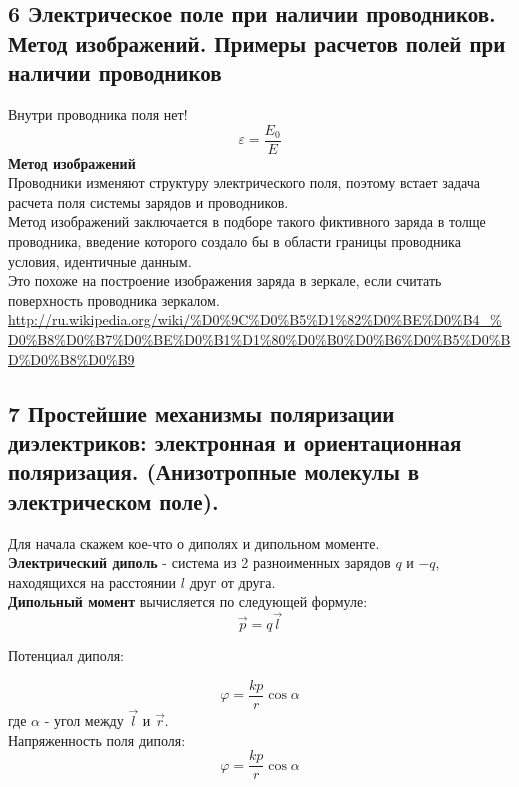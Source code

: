 \documentclass[a4paper,12pt]{article}
\begin{document}
\subsection{6   Электрическое поле при наличии проводников. Метод изображений. Примеры расчетов полей при наличии проводников}
Внутри проводника поля нет!\\
\begin{equation}
	\varepsilon = \frac{E_0}{E}
\end{equation}
\textbf{Метод изображений} \\
Проводники изменяют структуру электрического поля, поэтому встает задача расчета поля системы зарядов и проводников. \\
Метод изображений заключается в подборе такого фиктивного заряда в толще проводника, введение которого создало бы в области границы проводника условия, идентичные данным. \\
Это похоже на построение изображения заряда в зеркале, если считать поверхность проводника зеркалом. \\
\url{http://ru.wikipedia.org/wiki/%D0%9C%D0%B5%D1%82%D0%BE%D0%B4_%D0%B8%D0%B7%D0%BE%D0%B1%D1%80%D0%B0%D0%B6%D0%B5%D0%BD%D0%B8%D0%B9}

\subsection{7   Простейшие механизмы поляризации диэлектриков: электронная и ориентационная поляризация. (Анизотропные молекулы в электрическом поле).}
Для начала скажем кое-что о диполях и дипольном моменте. \\
\textbf{Электрический диполь} - система из 2 разноименных зарядов $ q $ и $ -q $, находящихся на расстоянии $ l $ друг от друга. \\
\textbf{Дипольный момент} вычисляется по следующей формуле:
\begin{equation}
	\vec{p} = q \vec{l}
\end{equation}

Потенциал диполя:

\begin{equation}
	\varphi = \frac {k p} {r} \cos {\alpha}
\end{equation}
где $ \alpha $ - угол между $ \vec{l} $ и $ \vec{r} $. \\

Напряженность поля диполя:
\begin{equation}
	\varphi = \frac {k p} {r} \cos {\alpha}
\end{equation}
\end{document}
